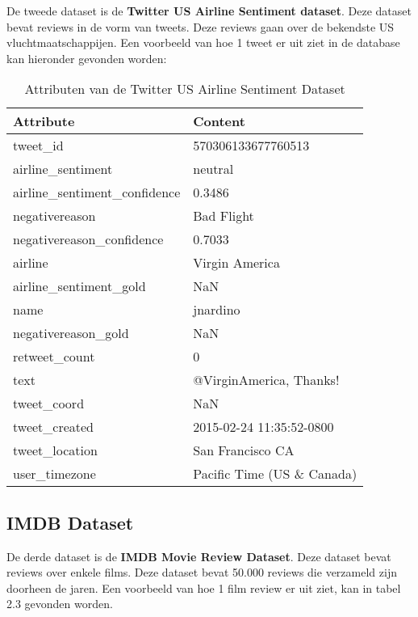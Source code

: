 De tweede dataset is de \textbf{Twitter US Airline Sentiment dataset}. Deze dataset bevat reviews in de vorm van tweets. Deze reviews gaan over de bekendste US vluchtmaatschappijen.\autocite{Kaggle2020} Een voorbeeld van hoe 1 tweet er uit ziet in de database kan hieronder gevonden worden:
\begin{table}[]
    \begin{tabular}{@{}|l|l|@{}}
        \toprule
        \textbf{Attribute}             & \textbf{Content}            \\ \midrule
        tweet\_id                      & 570306133677760513          \\
        airline\_sentiment             & neutral                     \\
        airline\_sentiment\_confidence & 0.3486                      \\
        negativereason                 & Bad Flight                  \\
        negativereason\_confidence     & 0.7033                      \\
        airline                        & Virgin America              \\
        airline\_sentiment\_gold       & NaN                         \\
        name                           & jnardino                    \\
        negativereason\_gold           & NaN                         \\
        retweet\_count                 & 0                           \\
        text                           & @VirginAmerica, Thanks!     \\
        tweet\_coord                   & NaN                         \\
        tweet\_created                 & 2015-02-24 11:35:52-0800    \\
        tweet\_location                & San Francisco CA            \\
        user\_timezone                 & Pacific Time (US \& Canada) \\ \bottomrule
    \end{tabular}
    \caption{Attributen van de Twitter US Airline Sentiment Dataset}
    \label{tab:twitterdataset}
\end{table}
\FloatBarrier

\subsection{IMDB Dataset}
\label{imdb}
De derde dataset is de \textbf{IMDB Movie Review Dataset}. Deze dataset bevat reviews over enkele films. Deze dataset bevat 50.000 reviews die verzameld zijn doorheen de jaren. \autocite{Maas2011} Een voorbeeld van hoe 1 film review er uit ziet, kan in tabel 2.3 gevonden worden. 


